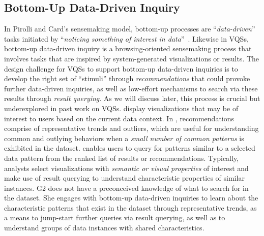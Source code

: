 {  \subsection{Bottom-Up Data-Driven Inquiry}%
  In Pirolli and Card's sensemaking model, bottom-up processes are ``\textit{data-driven}'' tasks initiated by ``\textit{noticing something of interest in data}''~\cite{Pirolli}. Likewise in VQSs, bottom-up data-driven inquiry is a browsing-oriented sensemaking process that involves tasks that are inspired by system-generated visualizations or results. The design challenge for VQSs to support bottom-up data-driven inquiries is to develop the right set of ``stimuli'' through \textit{recommendations} that could provoke further data-driven inquiries, as well as low-effort mechanisms to search via these results through \textit{result querying}. As we will discuss later, this process is crucial but underexplored in past work on VQSs. %
   display visualizations that may be of interest to users based on the current data context. In \zvpp, recommendations comprise of representative trends and outliers, which are useful for understanding common and outlying behaviors when a \emph{small number of common patterns} is exhibited in the dataset. %
   enables users to query for patterns similar to a selected data pattern from the ranked list of results or recommendations. Typically, analysts select visualizations with \emph{semantic or visual properties} of interest and make use of result querying to understand characteristic properties of similar instances.
   G2 does not have a preconceived knowledge of what to search for in the dataset. She engages with bottom-up data-driven inquiries to learn about the characteristic patterns that exist in the dataset through representative trends, as a means to jump-start further queries via result querying, as well as to understand groups of data instances with shared characteristics.
}
